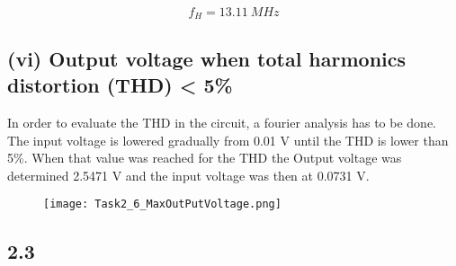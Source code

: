 	$$f_{H} = 13.11 \ M Hz $$

  \subsection*{(vi) Output voltage when total harmonics distortion (THD) < 5\%}
  In order to evaluate the THD in the circuit, a fourier analysis has to be done. The input voltage is lowered gradually from 0.01 V until the THD is lower than 5\%. When that value was reached for the THD the Output voltage was determined 2.5471 V and the input voltage was then at 0.0731 V.
  \begin{figure}[h!]
        \centering
        \texttt{[image: Task2\_6\_MaxOutPutVoltage.png]}
    \end{figure}
    
\pagebreak
  
\subsection*{2.3}
  